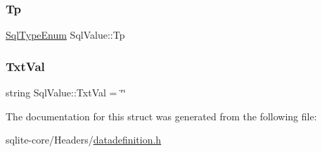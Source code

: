 \mbox{\label{structSqlValue_a59eef92117d6b8685a8970cad60c340e}} 
\subsubsection{\texorpdfstring{Tp}{Tp}}
{\footnotesize\ttfamily \mbox{\hyperlink{datadefinition_8h_ad06ef517a8bb3398f146f81f18988b9f}{Sql\+Type\+Enum}} Sql\+Value\+::\+Tp}

\mbox{\label{structSqlValue_ad867a5a62a7935a8106945672a1928c9}} 
\subsubsection{\texorpdfstring{Txt\+Val}{TxtVal}}
{\footnotesize\ttfamily string Sql\+Value\+::\+Txt\+Val = \char`\"{}\char`\"{}}



The documentation for this struct was generated from the following file\+:\begin{DoxyCompactItemize}
\item 
sqlite-\/core/\+Headers/\mbox{\hyperlink{datadefinition_8h}{datadefinition.\+h}}\end{DoxyCompactItemize}
